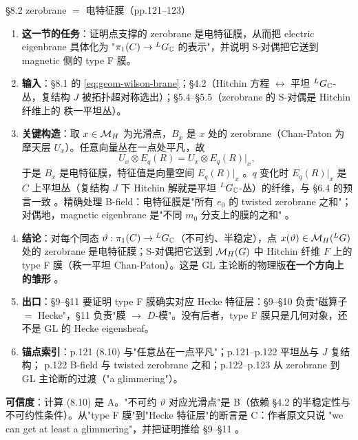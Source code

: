 \begin{kcard}{\S8.2 zerobrane $=$ 电特征膜（pp.121--123）}
\begin{enumerate}[label=\textbf{\arabic*}]
\item \textbf{这一节的任务}：证明点支撑的 zerobrane 是电特征膜，从而把 electric eigenbrane 具体化为
  "$\pi_1(C)\to{}^{L}G_{\mathbb{C}}$ 的表示"，并说明 S-对偶把它送到 magnetic 侧的 type F 膜。
\item \textbf{输入}：\S8.1 的 \eqref{eq:geom-wilson-brane}；\S4.2（Hitchin 方程 $\leftrightarrow$ 平坦
  ${}^{L}G_{\mathbb{C}}$-丛，复结构 $J$ 被拓扑超对称选出）；\S5.4--\S5.5（zerobrane 的 S-对偶是 Hitchin 纤维上的
  秩一平坦丛）。
\item \textbf{关键构造}：取 $x\in\mathcal{M}_H$ 为光滑点，$B_x$ 是 $x$ 处的 zerobrane（Chan-Paton 为摩天层
  $U_x$）。任意向量丛在一点处平凡，故
\begin{equation}
U_x\otimes E_q(R)=U_x\otimes E_q(R)|_x ,
\label{eq:geom-zerobrane}
\end{equation}
  于是 $B_x$ 是电特征膜，特征值是向量空间 $E_q(R)|_x$ \pA{}。$q$ 变化时
  $E_q(R)|_x$ 是 $C$ 上平坦丛（复结构 $J$ 下 Hitchin 解就是平坦 ${}^{L}G_{\mathbb{C}}$-丛）的纤维，与 \S6.4
  的预言一致 \pA{}。精确处理 B-field：电特征膜是"所有 $e_0$ 的
  twisted zerobrane 之和"；对偶地，magnetic eigenbrane 是"不同 $m_0$ 分支上的膜的之和"
  \pA{}。
\item \textbf{结论}：对每个同态 $\vartheta:\pi_1(C)\to{}^{L}G_{\mathbb{C}}$（不可约、半稳定），点 $x(\vartheta)\in\mathcal{M}_H({}^{L}G)$
  处的 zerobrane 是电特征膜；S-对偶把它送到 $\mathcal{M}_H(G)$ 中 Hitchin 纤维 $F$ 上的 type F 膜（秩一平坦
  Chan-Paton）。这是 GL 主论断的物理版\textbf{在一个方向上的雏形} \pA{}。
\item \textbf{出口}：\S9--\S11 要证明 type F 膜确实对应 Hecke 特征层：\S9--\S10 负责"磁算子 $=$
  Hecke"，\S11 负责"膜 $\to$ $D$-模"。没有后者，type F 膜只是几何对象，还不是 GL 的 Hecke eigensheaf。
\item \textbf{锚点索引}：p.121 (8.10) 与"任意丛在一点平凡"；p.121--p.122 平坦丛与 $J$ 复结构；
  p.122 B-field 与 twisted zerobrane 之和；p.122--p.123 从 zerobrane 到 GL 主论断的过渡（"a glimmering"）。
\end{enumerate}
\textbf{可信度}：计算 (8.10) 是 A。"不可约 $\vartheta$ 对应光滑点"是 B（依赖 \S4.2 的半稳定性与
不可约性条件）\pB{}。从"type F 膜"到"Hecke 特征层"的断言是 C：作者原文只说
"we can get at least a glimmering"，并把证明推给 \S9--\S11 \pC{}。
\end{kcard}


